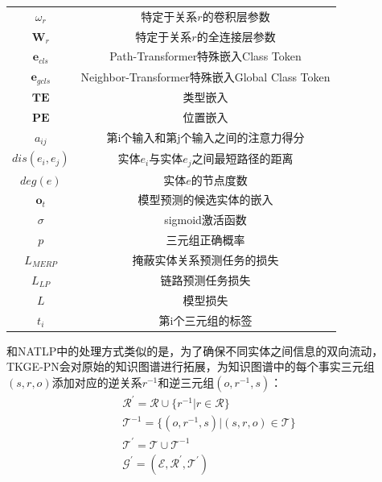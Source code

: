\begin{longtable}[htbp]{cc}
  $\omega_r$ & 特定于关系$r$的卷积层参数\\
  $\mathbf{W}_r$ &特定于关系$r$的全连接层参数\\
  $\boldsymbol{e}_{cls}$ & Path-Transformer特殊嵌入Class Token\\
  $\boldsymbol{e}_{gcls}$ & Neighbor-Transformer特殊嵌入Global Class Token\\
  $\mathbf{TE}$ & 类型嵌入\\
  $\mathbf{PE}$ & 位置嵌入\\
  $a_{ij}$ & 第i个输入和第j个输入之间的注意力得分\\
  $dis(e_i,e_j)$ & 实体$e_i$与实体$e_j$之间最短路径的距离\\
  $deg(e)$ & 实体$e$的节点度数\\
  $\boldsymbol{o}_t$ & 模型预测的候选实体的嵌入\\
  $\sigma $ & sigmoid激活函数\\
  $p$ & 三元组正确概率\\
  $L_{MERP}$ & 掩蔽实体关系预测任务的损失\\
  $L_{LP}$ & 链路预测任务损失\\
  $L$ & 模型损失\\
  $t_i$ & 第i个三元组的标签\\

\end{longtable}

和NATLP中的处理方式类似的是，为了确保不同实体之间信息的双向流动，TKGE-PN会对原始的知识图谱进行拓展，为知识图谱中的每个事实三元组$(s,r,o)$添加对应的逆关系$r^{-1}$和逆三元组$(o,r^{-1},s)$：
\begin{gather}
    \mathcal{R}^{\prime}=\mathcal{R}\cup\{ r^{-1} | r\in \mathcal{R}\}\\
    \mathcal{T}^{-1}= \{ (o,r^{-1},s)| (s,r,o)\in \mathcal{T}\}\\
    \mathcal{T}^{\prime} = \mathcal{T}\cup\mathcal{T}^{-1}\\
    \mathcal{G}^\prime = (\mathcal{E}, \mathcal{R}^\prime, \mathcal{T}^\prime)
\end{gather}


